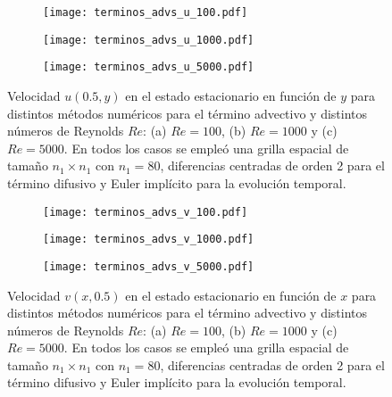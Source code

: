 \documentclass[aps,prb,twocolumn,superscriptaddress,floatfix,longbibliography,10pt]{revtex4-2}
\newcounter{para}
\begin{document}
\begin{figure}
  \centering
  \begin{subfigure}[b]{0.32\textwidth}
      \centering
      \texttt{[image: terminos\_advs\_u\_100.pdf]}
      \caption{}
      \label{fig:terminos_advs_u_100}
  \end{subfigure}
  \hfill
  \begin{subfigure}[b]{0.32\textwidth}
      \centering
      \texttt{[image: terminos\_advs\_u\_1000.pdf]}
      \caption{}
      \label{fig:terminos_advs_u_1000}
  \end{subfigure}
  \hfill
  \begin{subfigure}[b]{0.32\textwidth}
      \centering
      \texttt{[image: terminos\_advs\_u\_5000.pdf]}
      \caption{}
      \label{fig:terminos_advs_u_5000}
  \end{subfigure}
     \caption{Velocidad $u(0.5,y)$ en el estado estacionario en función de $y$ para distintos métodos numéricos para el término advectivo y distintos números de Reynolds $Re$: (a) $Re = 100$, (b) $Re = 1000$ y (c) $Re = 5000$. En todos los casos se empleó una grilla espacial de tamaño $n_1 \times n_1$ con $n_1 = 80$, diferencias centradas de orden 2 para el término difusivo y Euler implícito para la evolución temporal.}
     \label{fig:terminos_advs_u}
\end{figure}

\begin{figure}
  \centering
  \begin{subfigure}[b]{0.32\textwidth}
    \centering
    \texttt{[image: terminos\_advs\_v\_100.pdf]}
    \caption{}
    \label{fig:terminos_advs_v_100}
  \end{subfigure}
  \hfill
  \begin{subfigure}[b]{0.32\textwidth}
    \centering
    \texttt{[image: terminos\_advs\_v\_1000.pdf]}
    \caption{}
    \label{fig:terminos_advs_v_1000}
  \end{subfigure}
  \hfill
  \begin{subfigure}[b]{0.32\textwidth}
    \centering
    \texttt{[image: terminos\_advs\_v\_5000.pdf]}
    \caption{}
    \label{fig:terminos_advs_v_5000}
  \end{subfigure}
     \caption{Velocidad $v(x,0.5)$ en el estado estacionario en función de $x$ para distintos métodos numéricos para el término advectivo y distintos números de Reynolds $Re$: (a) $Re = 100$, (b) $Re = 1000$ y (c) $Re = 5000$. En todos los casos se empleó una grilla espacial de tamaño $n_1 \times n_1$ con $n_1 = 80$, diferencias centradas de orden 2 para el término difusivo y Euler implícito para la evolución temporal.}
     \label{fig:terminos_advs_v}
\end{figure}
\end{document}
